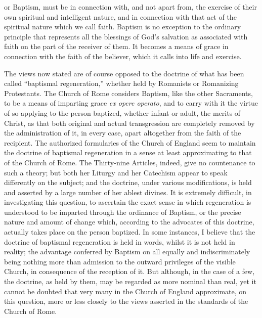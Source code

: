 \documentclass[
]{book}
\begin{document}
or Baptism, must be in connection with, and not apart from, the exercise of their own spiritual and intelligent nature, and in connection with that act of the spiritual nature which we call faith. Baptism is no exception to the ordinary principle that represents all the blessings of God's salvation as associated with faith on the part of the receiver of them. It becomes a means of grace in connection with the faith of the believer, which it calls into life and exercise.

The views now stated are of course opposed to the doctrine of what has been called ``baptismal regeneration,'' whether held by Romanists or Romanizing Protestants. The Church of Rome considers Baptism, like the other Sacraments, to be a means of imparting grace \foreignlanguage{latin}{\emph{ex opere operato}}, and to carry with it the virtue of so applying to the person baptized, whether infant or adult, the merits of Christ, as that both original and actual transgression are completely removed by the administration of it, in every case, apart altogether from the faith of the recipient. The authorized formularies of the Church of England seem to maintain the doctrine of baptismal regeneration in a sense at least approximating to that of the Church of Rome. The Thirty-nine Articles, indeed, give no countenance to such a theory; but both her Liturgy and her Catechism appear to speak differently on the subject; and the doctrine, under various modifications, is held and asserted by a large number of her ablest divines. It is extremely difficult, in investigating this question, to ascertain the exact sense in which regeneration is understood to be imparted through the ordinance of Baptism, or the precise nature and amount of change which, according to the advocates of this doctrine, actually takes place on the person baptized. In some instances, I believe that the doctrine of baptismal regeneration is held in words, whilst it is not held in reality; the advantage conferred by Baptism on all equally and indiscriminately being nothing more than admission to the outward privileges of the visible Church, in consequence of the reception of it. But although, in the case of a few, the doctrine, as held by them, may be regarded as more nominal than real, yet it cannot be doubted that very many in the Church of England approximate, on this question, more or less closely to the views asserted in the standards of the Church of Rome.
\end{document}
